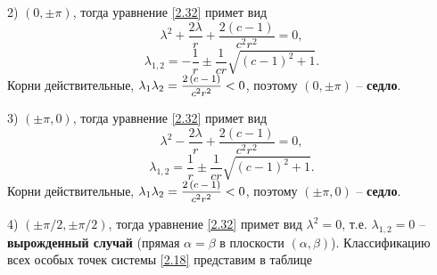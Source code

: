 \documentclass[a4paper,12pt, openany]{book}
\theoremstyle{plain} %
\theoremstyle{definition} %
\theoremstyle{remark} %
\numberwithin{equation}{chapter}
\begin{document}
{2) $(0,\pm\pi)$, тогда  уравнение \eqref{2.32} примет вид  
\[
\lambda ^2  + \frac{{2\lambda }}{r} + \frac{{2\left( {c - 1} \right)}}{{c^2 r^2 }} = 0,
\]
\[
\lambda _{1,2}  =  - \frac{1}{r} \pm \frac{1}{{cr}}\sqrt {\left( {c - 1} \right)^2  + 1}. 
\]
Корни действительные, $
\lambda _1 \lambda _2  = \mfrac{{2\left( {c - 1} \right)}}{{c^2 r^2 }} < 0
$, поэтому $(0,\pm\pi)$ -- \textbf{седло}. 

3) $(\pm\pi,0)$, тогда уравнение \eqref{2.32} примет вид
\[
\lambda ^2  - \frac{{2\lambda }}{r} + \frac{{2\left( {c - 1} \right)}}{{c^2 r^2 }} = 0,
\]
\[
\lambda _{1,2}  =   \frac{1}{r} \pm \frac{1}{{cr}}\sqrt {\left( {c - 1} \right)^2  + 1}. 
\]
Корни действительные, $
\lambda _1 \lambda _2  = \mfrac{{2\left( {c - 1} \right)}}{{c^2 r^2 }} < 0
$, поэтому $(\pm\pi,0)$ -- \textbf{седло}.

4) $(\pm\pi/2,\pm\pi/2)$, тогда уравнение \eqref{2.32} примет вид $\lambda^2 = 0$, т.е. $\lambda_{1,2} = 0$ -- \textbf{вырожденный случай} (прямая $\alpha = \beta$ в плоскости $(\alpha,\beta)$).
\newpage
Классификацию всех особых точек системы \eqref{2.18} представим в таблице

}
\end{document}
